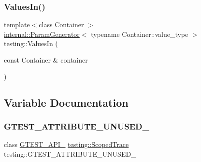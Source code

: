 \mbox{\label{namespacetesting_aa67d0c8470c5f69fcfcacc9e775fa982}} 
\subsubsection{\texorpdfstring{Values\+In()}{ValuesIn()}\hspace{0.1cm}{\footnotesize\ttfamily [3/3]}}
{\footnotesize\ttfamily template$<$class Container $>$ \\
\hyperlink{classtesting_1_1internal_1_1ParamGenerator}{internal\+::\+Param\+Generator}$<$ typename Container\+::value\+\_\+type $>$ testing\+::\+Values\+In (\begin{DoxyParamCaption}\item[{const Container \&}]{container }\end{DoxyParamCaption})}



\subsection{Variable Documentation}
\mbox{\label{namespacetesting_aa09221196f0a830d5bf1c63ffce69dc3}} 
\subsubsection{\texorpdfstring{G\+T\+E\+S\+T\+\_\+\+A\+T\+T\+R\+I\+B\+U\+T\+E\+\_\+\+U\+N\+U\+S\+E\+D\+\_\+}{GTEST\_ATTRIBUTE\_UNUSED\_}}
{\footnotesize\ttfamily class \hyperlink{gtest-port_8h_aa73be6f0ba4a7456180a94904ce17790}{G\+T\+E\+S\+T\+\_\+\+A\+P\+I\+\_\+} \hyperlink{classtesting_1_1ScopedTrace}{testing\+::\+Scoped\+Trace}  testing\+::\+G\+T\+E\+S\+T\+\_\+\+A\+T\+T\+R\+I\+B\+U\+T\+E\+\_\+\+U\+N\+U\+S\+E\+D\+\_\+}

